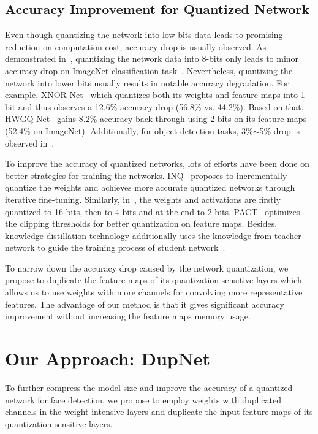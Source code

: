 \documentclass[10pt,twocolumn,letterpaper]{article}
\begin{document}
\subsection{Accuracy Improvement for Quantized Network}

Even though quantizing the network into low-bits data leads to promising reduction on computation cost, accuracy drop is usually observed. As demonstrated in~\cite{Google8bit,NvidiaInt8}, quantizing the network data into 8-bits  only leads to minor accuracy drop on ImageNet classification task~\cite{ImageNet}. Nevertheless, quantizing the network into lower bits usually results in notable accuracy degradation.  For example, XNOR-Net~\cite{XNOR} which quantizes both its weights and feature maps into 1-bit and thus observes a 12.6\% accuracy drop (56.8\% vs. 44.2\%). Based on that, HWGQ-Net~\cite{HWGQ} gains 8.2\% accuracy back through using 2-bits on its feature maps (52.4\% on ImageNet). Additionally, for object detection tasks, 3\%$\sim$5\% drop is observed in~\cite{SQuantizer}.

To improve the accuracy of quantized networks, lots of efforts have been done on better strategies for training the networks. INQ~\cite{INQ} proposes to incrementally quantize the weights and achieves more accurate quantized networks through iterative fine-tuning. Similarly, in~\cite{PQ}, the weights and activations are firstly quantized to 16-bits, then to 4-bits and at the end to 2-bits. PACT~\cite{PACT} optimizes the clipping thresholds for better quantization on feature maps. Besides, knowledge distillation technology additionally uses the knowledge from teacher network to guide the training process of student network~\cite{QunatMimic}. 

To narrow down the accuracy drop caused by the network quantization, we propose to duplicate the feature maps of its quantization-sensitive layers  which allows us to use weights with more channels for convolving more representative features. The advantage of our method is that it gives significant accuracy improvement without increasing the feature maps memory usage.

\section{Our Approach: DupNet}\label{Sec:hwgq}
To further compress the model size and improve the accuracy of a quantized network for face detection, we propose to employ weights with duplicated channels in the weight-intensive layers and duplicate the input feature maps of its quantization-sensitive layers. 
\end{document}
